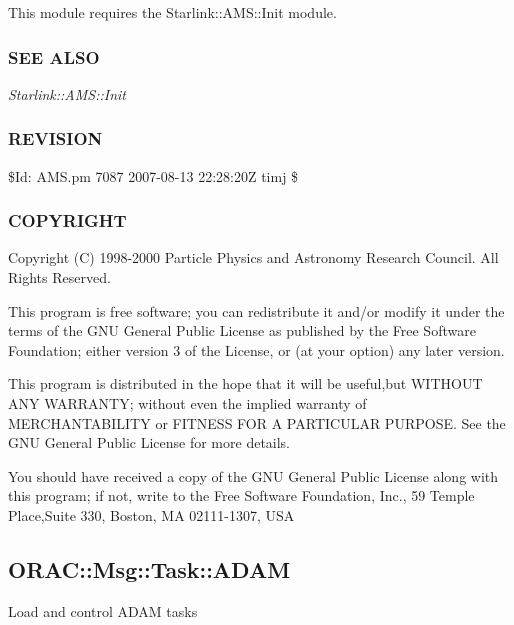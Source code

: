 \begin{description}
This module requires the Starlink::AMS::Init module.

\subsubsection*{SEE ALSO\label{ORAC::Msg::Control::AMS_SEE_ALSO}}


\emph{Starlink::AMS::Init}

\subsubsection*{REVISION\label{ORAC::Msg::Control::AMS_REVISION}}


\$Id: AMS.pm 7087 2007-08-13 22:28:20Z timj \$

\subsubsection*{COPYRIGHT\label{ORAC::Msg::Control::AMS_COPYRIGHT}}


Copyright (C) 1998-2000 Particle Physics and Astronomy Research
Council. All Rights Reserved.



This program is free software; you can redistribute it and/or modify it under
the terms of the GNU General Public License as published by the Free Software
Foundation; either version 3 of the License, or (at your option) any later
version.



This program is distributed in the hope that it will be useful,but WITHOUT ANY
WARRANTY; without even the implied warranty of MERCHANTABILITY or FITNESS FOR A
PARTICULAR PURPOSE. See the GNU General Public License for more details.



You should have received a copy of the GNU General Public License along with
this program; if not, write to the Free Software Foundation, Inc., 59 Temple
Place,Suite 330, Boston, MA  02111-1307, USA

\subsection{ORAC::Msg::Task::ADAM\label{ORAC::Msg::Task::ADAM}}


Load and control ADAM tasks


\end{description}
